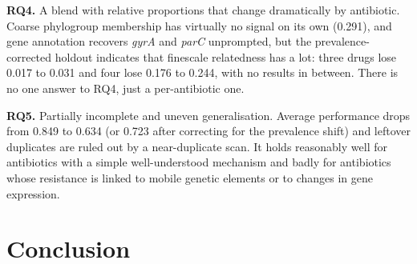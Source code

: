 \documentclass[journal]{IEEEtran}
\begin{document}
\textbf{RQ4.} A blend with relative proportions that change dramatically by
antibiotic. Coarse phylogroup membership has virtually no signal on its own (0.291),
and gene annotation recovers \textit{gyrA} and \textit{parC} unprompted, but the
prevalence-corrected holdout indicates that finescale relatedness has a lot: three
drugs lose 0.017 to 0.031 and four lose 0.176 to 0.244, with no results in between.
There is no one answer to RQ4, just a per-antibiotic one.

\textbf{RQ5.} Partially incomplete and uneven generalisation. Average performance
drops from 0.849 to 0.634 (or 0.723 after correcting for the prevalence shift) and
leftover duplicates are ruled out by a near-duplicate scan. It holds reasonably well
for antibiotics with a simple well-understood mechanism and badly for antibiotics
whose resistance is linked to mobile genetic elements or to changes in gene
expression.

\section{Conclusion}
\label{sec:conclusion}
\end{document}
